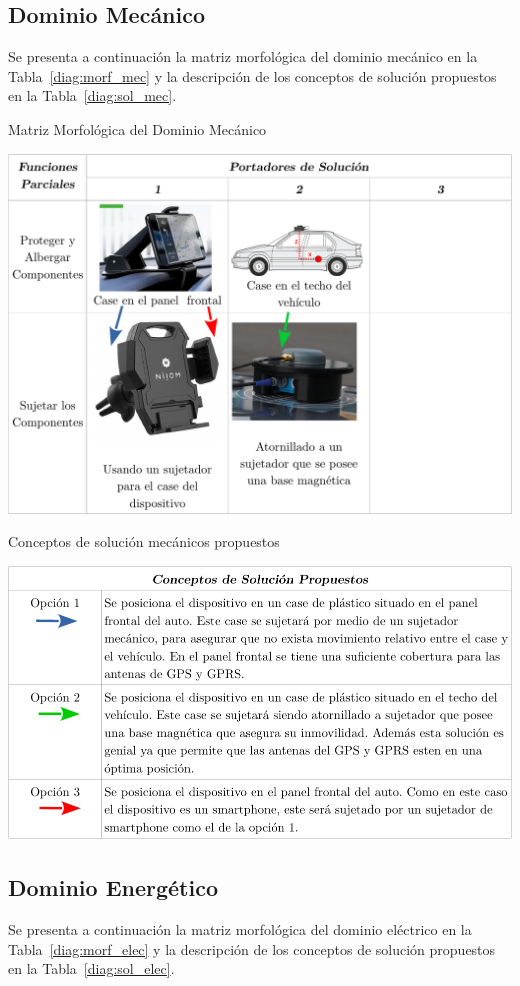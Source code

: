 \subsection{Dominio Mecánico}
Se presenta a continuación la matriz morfológica del dominio mecánico en la Tabla~\ref{diag:morf_mec} y la descripción de los conceptos de solución propuestos en la Tabla~\ref{diag:sol_mec}.
\begin{table}[htbp!]
  \caption{Matriz Morfológica del Dominio Mecánico}
  \label{diag:morf_mec}
  \centering
  \includegraphics[width=0.9\linewidth]{morf_mec.pdf}
\end{table}

\newpage
\begin{table}[htbp!]
  \caption{Conceptos de solución mecánicos propuestos}
  \label{diag:sol_mec}
  \includegraphics[width=\linewidth]{sol_mec.pdf}
\end{table}


\subsection{Dominio Energético}
Se presenta a continuación la matriz morfológica del dominio eléctrico en la Tabla~\ref{diag:morf_elec} y la descripción de los conceptos de solución propuestos en la Tabla~\ref{diag:sol_elec}.

